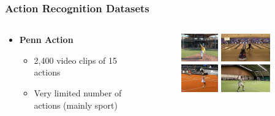 \documentclass[9pt]{beamer}
\providecommand{\source}{\\ \footnotesize \tugreen{Source:} \footnotemark}
\newenvironment{myframe}[1][]{%
\begin{frame}%
\frametitle{#1}
\setcounter{footnote}{0}


}{%
\end{frame}%
}
\begin{document}
\begin{myframe}[Action Recognition Datasets]
  \begin{columns}[T]
      \begin{column}{.48\textwidth}
          \vspace{20px}
          \begin{itemize}
              \item \textbf{Penn Action\footnotemark}
              \begin{itemize}
                  \item 2,400 video clips of 15 actions
                  \item Very limited number of actions (mainly sport)
              \end{itemize}
          \end{itemize}
      \end{column}
      \begin{column}{.48\textwidth}
          \begin{figure}
              \includegraphics[height=45px]{pa-01.jpg}
              \includegraphics[height=45px]{pa-02.jpg}
              \includegraphics[height=45px]{pa-03.jpg}
              \includegraphics[height=45px]{pa-04.jpg}
              \source
          \end{figure}
      \end{column}
  \end{columns}
\end{myframe}
\end{document}
